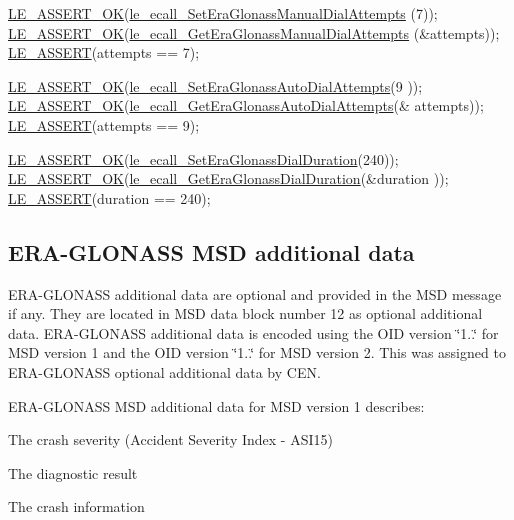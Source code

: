 \begin{DoxyCodeInclude}
    \hyperlink{le__log_8h_a7cd2daa3d4af1de4d29e0eed95187484}{LE\_ASSERT\_OK}(\hyperlink{le__ecall__interface_8h_a15127a7b0500796257795aaf64acd1e2}{le\_ecall\_SetEraGlonassManualDialAttempts}
      (7));
    \hyperlink{le__log_8h_a7cd2daa3d4af1de4d29e0eed95187484}{LE\_ASSERT\_OK}(\hyperlink{le__ecall__interface_8h_a579169dbcb91369caa156d2c0e3462c1}{le\_ecall\_GetEraGlonassManualDialAttempts}
      (&attempts));
    \hyperlink{le__log_8h_ac0dbbef91dc0fed449d0092ff0557b39}{LE\_ASSERT}(attempts == 7);

    \hyperlink{le__log_8h_a7cd2daa3d4af1de4d29e0eed95187484}{LE\_ASSERT\_OK}(\hyperlink{le__ecall__interface_8h_a836aaf195c0648d41f4a13f8c7ced736}{le\_ecall\_SetEraGlonassAutoDialAttempts}(9
      ));
    \hyperlink{le__log_8h_a7cd2daa3d4af1de4d29e0eed95187484}{LE\_ASSERT\_OK}(\hyperlink{le__ecall__interface_8h_af8beed56bd3be9bee8a771e05c498ac8}{le\_ecall\_GetEraGlonassAutoDialAttempts}(&
      attempts));
    \hyperlink{le__log_8h_ac0dbbef91dc0fed449d0092ff0557b39}{LE\_ASSERT}(attempts == 9);

    \hyperlink{le__log_8h_a7cd2daa3d4af1de4d29e0eed95187484}{LE\_ASSERT\_OK}(\hyperlink{le__ecall__interface_8h_a6c934a9e5aad11eb6f009a6bf34fca19}{le\_ecall\_SetEraGlonassDialDuration}(240));
    \hyperlink{le__log_8h_a7cd2daa3d4af1de4d29e0eed95187484}{LE\_ASSERT\_OK}(\hyperlink{le__ecall__interface_8h_afeb92d26dd8a2c092e96b07f3dc0391d}{le\_ecall\_GetEraGlonassDialDuration}(&duration
      ));
    \hyperlink{le__log_8h_ac0dbbef91dc0fed449d0092ff0557b39}{LE\_ASSERT}(duration == 240);
\end{DoxyCodeInclude}
 \hypertarget{c_SDD_eCall_le_ecall_eraGlonassData}{}\subsection{E\+R\+A-\/\+G\+L\+O\+N\+A\+S\+S M\+S\+D additional data}\label{c_SDD_eCall_le_ecall_eraGlonassData}
E\+R\+A-\/\+G\+L\+O\+N\+A\+SS additional data are optional and provided in the M\+SD message if any. They are located in M\+SD data block number 12 as optional additional data. E\+R\+A-\/\+G\+L\+O\+N\+A\+SS additional data is encoded using the O\+ID version \char`\"{}1..\char`\"{} for M\+SD version 1 and the O\+ID version \char`\"{}1..\char`\"{} for M\+SD version 2. This was assigned to E\+R\+A-\/\+G\+L\+O\+N\+A\+SS optional additional data by C\+EN.

E\+R\+A-\/\+G\+L\+O\+N\+A\+SS M\+SD additional data for M\+SD version 1 describes\+:
\begin{DoxyItemize}
\item The crash severity (Accident Severity Index -\/ A\+S\+I15)
\item The diagnostic result
\item The crash information
\end{DoxyItemize}

